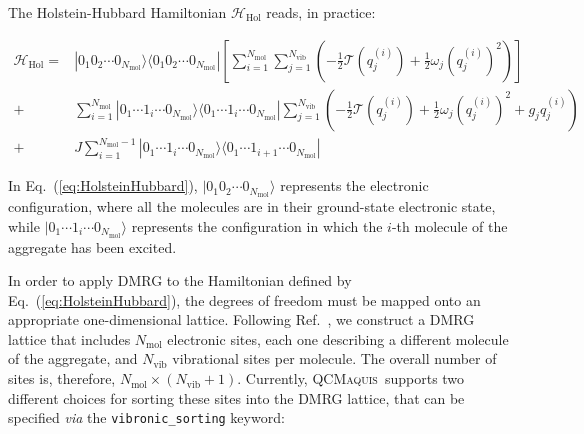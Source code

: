 \documentclass[bibliography=totoc,12pt,a4paper]{scrartcl}
\newcommand{\qcm}{\textsc{QCMaquis}}
\begin{document}
The Holstein-Hubbard Hamiltonian $\mathcal{H}_\text{Hol}$ reads, in practice:

\begin{equation}
 \begin{aligned}
  \mathcal{H}_\text{Hol} =& | 0_1 0_2 \cdots 0_{N_\text{mol}} \rangle \langle 0_1 0_2 \cdots 0_{N_\text{mol}} |
	\left[ \sum_{i=1}^{N_\text{mol}} \sum_{j=1}^{N_\text{vib}} 
			\left( -\frac{1}{2} \mathcal{T}(q_{j}^{(i)}) + \frac{1}{2} \omega_j \left( q_j^{(i)} \right)^2 \right)
	\right] \\
	+& \sum_{i=1}^{N_\text{mol}} | 0_1 \cdots 1_i \cdots 0_{N_\text{mol}} \rangle 
								 \langle 0_1 \cdots 1_i \cdots 0_{N_\text{mol}} | 
	   \sum_{j=1}^{N_\text{vib}}
	   \left( -\frac{1}{2} \mathcal{T}(q_{j}^{(i)}) + \frac{1}{2} \omega_j \left( q_j^{(i)} \right)^2 
			  + g_j q_{j}^{(i)} \right) \\
    +& J \sum_{i=1}^{N_\text{mol}-1} | 0_1 \cdots 1_i \cdots 0_{N_\text{mol}} \rangle
	   								 \langle 0_1 \cdots 1_{i+1} \cdots 0_{N_\text{mol}} |
 \end{aligned}
 \label{eq:HolsteinHubbard}
\end{equation}

In Eq.~(\ref{eq:HolsteinHubbard}), $| 0_1 0_2 \cdots 0_{N_\text{mol}} \rangle$ represents the electronic configuration, where all the molecules are in their ground-state electronic state, while $| 0_1 \cdots 1_i \cdots 0_{N_\text{mol}} \rangle$ represents the configuration in which the $i$-th molecule of the aggregate has been excited.

In order to apply DMRG to the Hamiltonian defined by Eq.~(\ref{eq:HolsteinHubbard}), the degrees of freedom must be mapped onto an appropriate one-dimensional lattice.
Following Ref.~, we construct a DMRG lattice that includes $N_\text{mol}$ electronic sites, each one describing a different molecule of the aggregate, and $N_\text{vib}$ vibrational sites per molecule.
The overall number of sites is, therefore, $N_\text{mol} \times (N_\text{vib}+1)$.
Currently, \qcm\ supports two different choices for sorting these sites into the DMRG lattice, that can be specified \textit{via} the \texttt{vibronic\_sorting} keyword:
\end{document}
